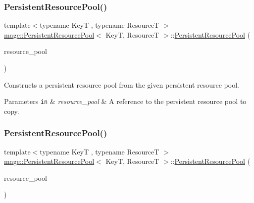 \subsubsection{\texorpdfstring{Persistent\+Resource\+Pool()}{PersistentResourcePool()}\hspace{0.1cm}{\footnotesize\ttfamily [2/3]}}
{\footnotesize\ttfamily template$<$typename KeyT , typename ResourceT $>$ \\
\hyperlink{classmage_1_1_persistent_resource_pool}{mage\+::\+Persistent\+Resource\+Pool}$<$ KeyT, ResourceT $>$\+::\hyperlink{classmage_1_1_persistent_resource_pool}{Persistent\+Resource\+Pool} (\begin{DoxyParamCaption}\item[{const \hyperlink{classmage_1_1_persistent_resource_pool}{Persistent\+Resource\+Pool}$<$ KeyT, ResourceT $>$ \&}]{resource\+\_\+pool }\end{DoxyParamCaption})\hspace{0.3cm}{\ttfamily [delete]}}

Constructs a persistent resource pool from the given persistent resource pool.


\begin{DoxyParams}[1]{Parameters}
\mbox{\tt in}  & {\em resource\+\_\+pool} & A reference to the persistent resource pool to copy. \\
\hline
\end{DoxyParams}
\hypertarget{classmage_1_1_persistent_resource_pool_a65d48a56df4fc2ea4f38ffbc7a23a59d}{}\label{classmage_1_1_persistent_resource_pool_a65d48a56df4fc2ea4f38ffbc7a23a59d} 
\subsubsection{\texorpdfstring{Persistent\+Resource\+Pool()}{PersistentResourcePool()}\hspace{0.1cm}{\footnotesize\ttfamily [3/3]}}
{\footnotesize\ttfamily template$<$typename KeyT , typename ResourceT $>$ \\
\hyperlink{classmage_1_1_persistent_resource_pool}{mage\+::\+Persistent\+Resource\+Pool}$<$ KeyT, ResourceT $>$\+::\hyperlink{classmage_1_1_persistent_resource_pool}{Persistent\+Resource\+Pool} (\begin{DoxyParamCaption}\item[{\hyperlink{classmage_1_1_persistent_resource_pool}{Persistent\+Resource\+Pool}$<$ KeyT, ResourceT $>$ \&\&}]{resource\+\_\+pool }\end{DoxyParamCaption})}

